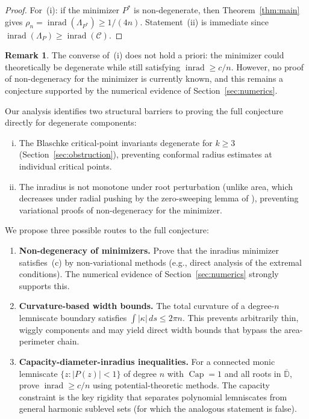 \documentclass[11pt,a4paper]{amsart}
\theoremstyle{definition}
\newtheorem{remark}[theorem]{Remark}
\newcommand{\D}{\mathbb{D}}
\newcommand{\abs}[1]{\lvert #1 \rvert}
\newcommand{\inrad}{\operatorname{inrad}}
\renewcommand{\Cap}{\operatorname{Cap}}
\begin{document}
\begin{proof}
For~(i): if the minimizer $P^*$ is non-degenerate, then
Theorem~\ref{thm:main} gives
$\rho_n = \inrad(\Lambda_{P^*}) \geq 1/(4n)$.
Statement~(ii) is immediate since
$\inrad(\Lambda_P) \geq \inrad(\mathcal{C})$.
\end{proof}

\begin{remark}
The converse of~(i) does not hold a priori: the minimizer could
theoretically be degenerate while still satisfying $\inrad \geq c/n$.
However, no proof of non-degeneracy for the minimizer is currently known,
and this remains a conjecture supported by the numerical evidence of
Section~\ref{sec:numerics}.
\end{remark}

Our analysis identifies two structural barriers to proving the
full conjecture directly for degenerate components:
\begin{enumerate}[(i)]
  \item The Blaschke critical-point invariants degenerate for
    $k \geq 3$ (Section~\ref{sec:obstruction}), preventing
    conformal radius estimates at individual critical points.
  \item The inradius is not monotone under root perturbation
    (unlike area, which decreases under radial pushing by the
    zero-sweeping lemma of \cite{KLR25}), preventing variational
    proofs of non-degeneracy for the minimizer.
\end{enumerate}

We propose three possible routes to the full conjecture:
\begin{enumerate}
  \item \textbf{Non-degeneracy of minimizers.}
    Prove that the inradius minimizer satisfies~(c) by
    non-variational methods (e.g., direct analysis of the
    extremal conditions).  The numerical evidence of
    Section~\ref{sec:numerics} strongly supports this.

  \item \textbf{Curvature-based width bounds.}
    The total curvature of a degree-$n$ lemniscate boundary
    satisfies $\int \abs{\kappa}\,ds \leq 2\pi n$.
    This prevents arbitrarily thin, wiggly components and may
    yield direct width bounds that bypass the area-perimeter chain.

  \item \textbf{Capacity-diameter-inradius inequalities.}
    For a connected monic lemniscate $\{z : \abs{P(z)} < 1\}$
    of degree $n$ with $\Cap = 1$ and all roots in $\overline{\D}$,
    prove $\inrad \geq c/n$ using potential-theoretic methods.
    The capacity constraint is the key rigidity that separates
    polynomial lemniscates from general harmonic sublevel sets
    (for which the analogous statement is false).
\end{enumerate}
\end{document}
